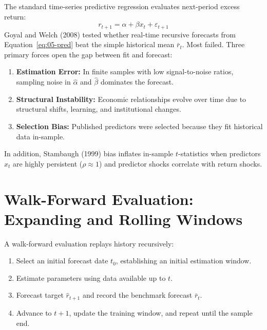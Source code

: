 The standard time-series predictive regression evaluates next-period excess return:
\begin{equation}
  r_{t+1} = \alpha + \beta x_t + \varepsilon_{t+1}
  \label{eq:05-pred}
\end{equation}
Goyal and Welch (2008) tested whether real-time recursive forecasts from Equation~\eqref{eq:05-pred} beat the simple historical mean $\bar{r}_t$. Most failed. Three primary forces open the gap between fit and forecast:
\begin{enumerate}
  \item \textbf{Estimation Error:} In finite samples with low signal-to-noise ratios, sampling noise in $\hat{\alpha}$ and $\hat{\beta}$ dominates the forecast.
  \item \textbf{Structural Instability:} Economic relationships evolve over time due to structural shifts, learning, and institutional changes.
  \item \textbf{Selection Bias:} Published predictors were selected because they fit historical data in-sample.
\end{enumerate}
In addition, Stambaugh (1999) bias inflates in-sample $t$-statistics when predictors $x_t$ are highly persistent ($\rho \approx 1$) and predictor shocks correlate with return shocks.

\section{Walk-Forward Evaluation: Expanding and Rolling Windows}
\label{sec:05-walkforward}

A walk-forward evaluation replays history recursively:
\begin{enumerate}
  \item Select an initial forecast date $t_0$, establishing an initial estimation window.
  \item Estimate parameters using data available up to $t$.
  \item Forecast target $\hat{r}_{t+1}$ and record the benchmark forecast $\bar{r}_t$.
  \item Advance to $t+1$, update the training window, and repeat until the sample end.
\end{enumerate}

